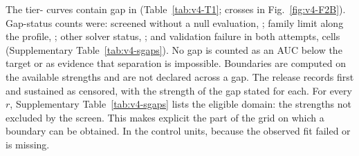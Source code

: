 The tier- curves contain  gap  in   (Table~\ref{tab:v4-T1}; crosses in Fig.~\ref{fig:v4-F2B}). %
Gap-status counts were: screened without a null evaluation, ; family limit along the profile, ; other solver status, ; and validation failure in both attempts,  cells (Supplementary Table~\ref{tab:v4-sgaps}). %
No gap is counted as an AUC below the target or as evidence that separation is impossible. %
Boundaries are computed on the available strengths and are not declared across a gap. The release records  first  and  sustained  as censored, with the strength of the gap stated for each. %
For every $r$, Supplementary Table~\ref{tab:v4-sgaps} lists the eligible domain: the strengths not excluded by the screen. This makes explicit the part of the grid on which a boundary can be obtained. %
In the control units,    because the observed fit  failed or is missing. %


